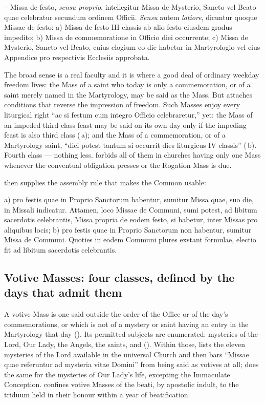 \begin{rulebox}{--}
Missa de festo, \textit{sensu proprio}, intellegitur Missa de Mysterio, Sancto
vel Beato quae celebratur secundum ordinem Officii. \textit{Sensu} autem
\textit{latiore}, dicuntur quoque Missae de festo: a) Missa de festo III
classis ab alio festo eiusdem gradus impedito; b) Missa de commemoratione in
Officio diei occurrente; c) Missa de Mysterio, Sancto vel Beato, cuius elogium
eo die habetur in Martyrologio vel eius Appendice pro respectivis Ecclesiis
approbata.
\end{rulebox}

The broad sense is a real faculty and it is where a good deal of ordinary
weekday freedom lives: the Mass of a saint who today is only a commemoration,
or of a saint merely named in the Martyrology, may be said as the Mass. But
 attaches conditions that reverse the impression of freedom. Such
Masses enjoy every liturgical right ``ac si festum cum integro Officio
celebraretur,'' yet: the Mass of an impeded third-class feast may be said on
its own day only if the impeding feast is also third class (\,a); and
the Mass of a commemoration, or of a Martyrology saint, ``dici potest tantum
si occurrit dies liturgicus IV classis'' (\,b). Fourth class ---
nothing less.  forbids all of them in churches having only one Mass
whenever the conventual obligation presses or the Rogation Mass is due.

 then supplies the assembly rule that makes the Common usable:

\begin{rulebox}{}
a) pro festis quae in Proprio Sanctorum habentur, sumitur Missa quae, suo die,
in Missali indicatur. Attamen, loco Missae de Communi, sumi potest, ad libitum
sacerdotis celebrantis, Missa propria de eodem festo, si habetur, inter Missas
pro aliquibus locis; b) pro festis quae in Proprio Sanctorum non habentur,
sumitur Missa de Communi. Quoties in eodem Communi plures exstant formulae,
electio fit ad libitum sacerdotis celebrantis.
\end{rulebox}

\subsection{Votive Masses: four classes, defined by the days that admit them}

A votive Mass is one said outside the order of the Office or of the day's
commemorations, or which is not of a mystery or saint having an entry in the
Martyrology that day (). Its permitted subjects are enumerated:
mysteries of the Lord, Our Lady, the Angels, the saints, and 
(). Within those,  lists the eleven mysteries of the Lord
available in the universal Church and then bars ``Missae quae referuntur ad
mysteria vitae Domini'' from being said as votives at all;  does the
same for the mysteries of Our Lady's life, excepting the Immaculate
Conception.  confines votive Masses of the beati, by apostolic
indult, to the triduum held in their honour within a year of beatification.

